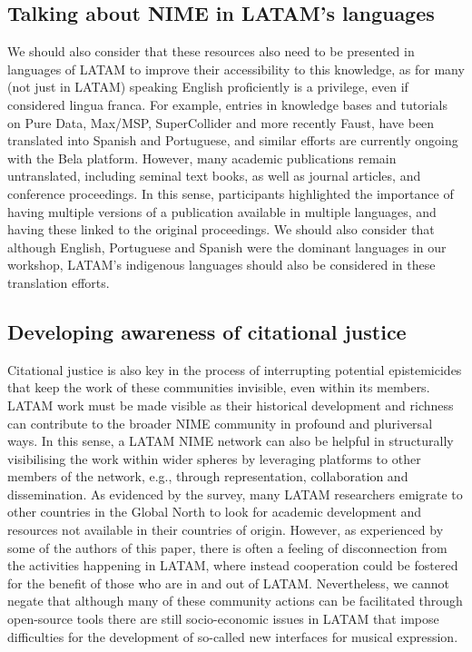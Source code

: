 \documentclass[sigconf]{nimeart}
\begin{document}
\subsection{Talking about NIME in LATAM's languages}\label{talking-about-nime-in-latams-languages}

We should also consider that these resources also need to be presented in languages of LATAM to improve their accessibility to this knowledge, as for many (not just in LATAM) speaking English proficiently is a privilege, even if considered lingua franca. For example, entries in knowledge bases and tutorials on Pure Data, Max/MSP, SuperCollider and more recently Faust, have been translated into Spanish and Portuguese, and similar efforts are currently ongoing with the Bela platform. However, many academic publications remain untranslated, including seminal text books, as well as journal articles, and conference proceedings. In this sense, participants highlighted the importance of having multiple versions of a publication available in multiple languages, and having these linked to the original proceedings. We should also consider that although English, Portuguese and Spanish were the dominant languages in our workshop, LATAM's indigenous languages should also be considered in these translation efforts.~~

\subsection{Developing awareness of citational justice}\label{developing-awareness-of-citational-justice}

Citational justice \cite{10.1145U002F3411763.3450389} is also key in the process of interrupting potential epistemicides \cite{10.1002U002Fasi.24479} that keep the work of these communities invisible, even within its members. LATAM work must be made visible \cite{MatusLerner2019} as their historical development and richness can contribute to the broader NIME community in profound and pluriversal ways. In this sense, a LATAM NIME network can also be helpful in structurally visibilising the work within wider spheres by leveraging platforms to other members of the network, e.g., through representation, collaboration and dissemination. As evidenced by the survey, many LATAM researchers emigrate to other countries in the Global North to look for academic development and resources not available in their countries of origin. However, as experienced by some of the authors of this paper, there is often a feeling of disconnection from the activities happening in LATAM, where instead cooperation could be fostered for the benefit of those who are in and out of LATAM. Nevertheless, we cannot negate that although many of these community actions can be facilitated through open-source tools there are still socio-economic issues in LATAM that impose difficulties for the development of so-called new interfaces for musical expression.
\end{document}

